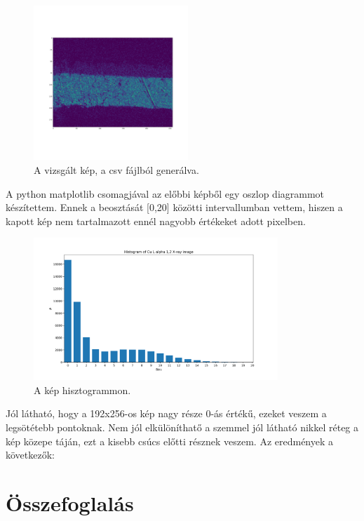 \documentclass[a4paper,12pt]{article}
\begin{document}
\begin{figure}[H]
	\centering
	\includegraphics[width=0.52\textwidth]{histoimg.png}
	\caption{A vizsgált kép, a csv fájlból generálva.}
\end{figure}

\par A python matplotlib csomagjával az előbbi képből egy oszlop diagrammot
készítettem. Ennek a beosztását [0,20] közötti intervallumban vettem, hiszen a
kapott kép nem tartalmazott ennél nagyobb értékeket adott pixelben.

\begin{figure}[H]
	\centering
	\includegraphics[width=0.82\textwidth]{histo.png}
	\caption{A kép hisztogrammon.}
\end{figure}

\par Jól látható, hogy a 192x256-os kép nagy része 0-ás értékű, ezeket veszem a legsötétebb
pontoknak. Nem jól elkülöníthatő a szemmel jól látható nikkel réteg a kép
közepe táján, ezt a kisebb csúcs előtti résznek veszem. Az eredmények a következők:



\section{Összefoglalás}

\par 
\end{document}
